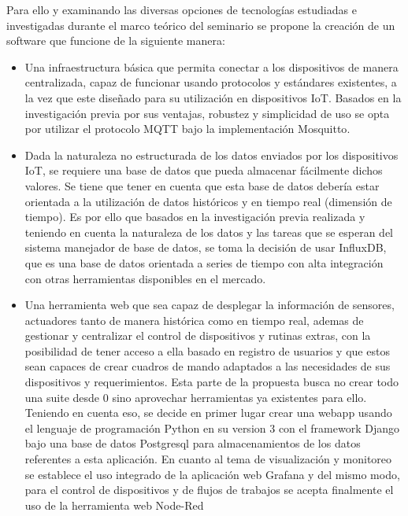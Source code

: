 Para ello y examinando las diversas opciones de tecnologías estudiadas e investigadas durante el marco teórico del seminario se propone la creación de un software que funcione de la siguiente manera: 
\begin{itemize}
\item Una infraestructura básica que permita conectar a los dispositivos de manera centralizada, capaz de funcionar usando protocolos y estándares existentes, a la vez que este diseñado para su utilización en dispositivos IoT. Basados en la investigación previa por sus ventajas, robustez y simplicidad de uso se opta por utilizar el protocolo MQTT\cite{iotprotocols} bajo la implementación Mosquitto\cite{ALight2017}.

\item Dada la naturaleza no estructurada de los datos enviados por los dispositivos IoT, se requiere una base de datos que pueda almacenar fácilmente dichos valores. Se tiene que tener en cuenta que esta base de datos debería estar orientada a la utilización de datos históricos y en tiempo real (dimensión de tiempo). Es por ello que basados en la investigación previa realizada y teniendo en cuenta la naturaleza de los datos y las tareas que se esperan del sistema manejador de base de datos, se toma la decisión de usar InfluxDB\cite{influxdb}, que es una base de datos orientada a series de tiempo con alta integración con otras herramientas disponibles en el mercado.

\item  Una herramienta web que sea capaz de desplegar la información de sensores, actuadores tanto de manera histórica como en tiempo real, ademas de gestionar y centralizar el control de dispositivos y rutinas extras, con la posibilidad de tener acceso a ella basado en registro de usuarios y que estos sean capaces de crear cuadros de mando adaptados a las necesidades de sus dispositivos y requerimientos. Esta parte de la propuesta busca no crear todo una suite desde 0 sino aprovechar herramientas ya existentes para ello. Teniendo en cuenta eso, se decide en primer lugar crear una webapp usando el lenguaje de programación Python\cite{whatspython} en su version 3 con el framework Django\cite{django} bajo una base de datos Postgresql\cite{postgresql} para almacenamientos de los datos referentes a esta aplicación. En cuanto al tema de visualización y monitoreo se establece el uso integrado de la aplicación web Grafana\cite{grafana} y del mismo modo, para el control de dispositivos y de flujos de trabajos se acepta finalmente el uso de la herramienta web Node-Red\cite{nodered}

\end{itemize}

